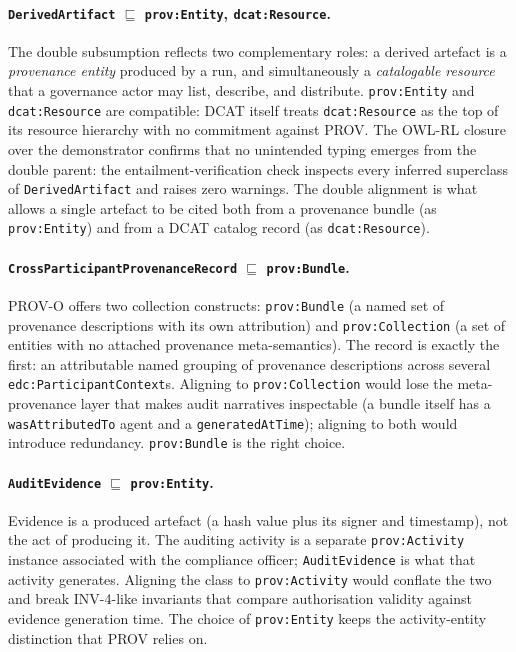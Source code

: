 \documentclass[Afour,sagev,times]{sagej}
\newcommand{\code}[1]{\texttt{#1}}
\begin{document}
\paragraph{\code{DerivedArtifact} $\sqsubseteq$ \code{prov:Entity}, \code{dcat:Resource}.} The double subsumption reflects two complementary roles: a derived artefact is a \emph{provenance entity} produced by a run, and simultaneously a \emph{catalogable resource} that a governance actor may list, describe, and distribute. \code{prov:Entity} and \code{dcat:Resource} are compatible: DCAT itself treats \code{dcat:Resource} as the top of its resource hierarchy with no commitment against PROV. The OWL-RL closure over the demonstrator confirms that no unintended typing emerges from the double parent: the entailment-verification check inspects every inferred superclass of \code{DerivedArtifact} and raises zero warnings. The double alignment is what allows a single artefact to be cited both from a provenance bundle (as \code{prov:Entity}) and from a DCAT catalog record (as \code{dcat:Resource}).

\paragraph{\code{CrossParticipantProvenanceRecord} $\sqsubseteq$ \code{prov:Bundle}.} PROV-O offers two collection constructs: \code{prov:Bundle} (a named set of provenance descriptions with its own attribution) and \code{prov:Collection} (a set of entities with no attached provenance meta-semantics). The record is exactly the first: an attributable named grouping of provenance descriptions across several \code{edc:ParticipantContext}s. Aligning to \code{prov:Collection} would lose the meta-provenance layer that makes audit narratives inspectable (a bundle itself has a \code{wasAttributedTo} agent and a \code{generatedAtTime}); aligning to both would introduce redundancy. \code{prov:Bundle} is the right choice.

\paragraph{\code{AuditEvidence} $\sqsubseteq$ \code{prov:Entity}.} Evidence is a produced artefact (a hash value plus its signer and timestamp), not the act of producing it. The auditing activity is a separate \code{prov:Activity} instance associated with the compliance officer; \code{AuditEvidence} is what that activity generates. Aligning the class to \code{prov:Activity} would conflate the two and break INV-4-like invariants that compare authorisation validity against evidence generation time. The choice of \code{prov:Entity} keeps the activity-entity distinction that PROV relies on.
\end{document}
